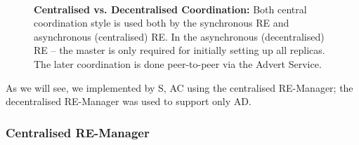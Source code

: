 \documentclass{rspublic}
\newcommand{\jhanote}[1]{ {\textcolor{red} { ***shantenu: #1 }}}
\newcommand{\jhanote}[1]{}
\begin{document}


\begin{figure}%
\centering
{}\qquad
{}\\
\caption{\textbf{Centralised vs. Decentralised Coordination:} Both
  central coordination style is used both by the synchronous RE  and asynchronous (centralised) RE.  In the asynchronous (decentralised) RE --
  the master is only required for initially setting up all
  replicas. The later coordination is done peer-to-peer via the Advert
  Service.}
\label{fig:coordination}
\end{figure}



As we will see, we implemented by S, AC using the centralised
RE-Manager; the decentralised RE-Manager was used to support only AD.

\subsubsection{Centralised RE-Manager}

\end{document}
